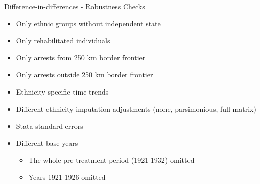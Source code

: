 \documentclass[11pt]{beamer}
\begin{document}
\begin{frame}[label=robustness_checks]{Difference-in-differences - Robustness Checks}
    \begin{itemize}
        \item Only ethnic groups without independent state \hyperlink{did_without_ind_state}{}
        \item Only rehabilitated individuals \hyperlink{did_rehabs}{}
        \item Only arrests from 250 km border frontier \hyperlink{did_border_area}{}
        \item Only arrests outside 250 km border frontier \hyperlink{did_non_border_area}{}
        \item Ethnicity-specific time trends  \hyperlink{did_time_trends}{}
        \item Different ethnicity imputation adjustments (none, parsimonious, full matrix)   \hyperlink{did_pred_adj}{}
        \item Stata standard errors  \hyperlink{did_stata_se}{}
        \item Different base years 
        \begin{itemize}
            \item The whole pre-treatment period (1921-1932) omitted \hyperlink{did_from_1933}{}
            \item Years 1921-1926 omitted \hyperlink{did_from_1927}{}
        \end{itemize}

    \end{itemize}
\end{frame}
\end{document}
